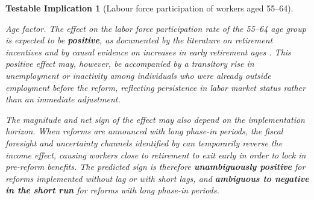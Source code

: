 \documentclass[11pt,english,a4paper, twoside, authoryear]{article}
\newtheorem{testable}{Testable Implication}}
\begin{document}
\begin{testable}[Labour force participation of workers aged 55--64]\label{test:emp_old}

\textit{Age factor.} %
The effect on the labor force participation rate of the 55--64 age group is expected to be \textbf{positive}, as documented by the literature on retirement incentives \citep{GruberWise1999} and by causal evidence on increases in early retirement ages \citep{StaubliZweimuller2013}. This positive effect may, however, be accompanied by a transitory rise in unemployment or inactivity among individuals who were already outside employment before the reform, reflecting persistence in labor market status rather than an immediate adjustment.

The magnitude and net sign of the effect may also depend on the implementation horizon. When reforms are announced with long phase-in periods, the fiscal foresight and uncertainty channels identified by \citet{BiZubairy2023} can temporarily reverse the income effect, causing workers close to retirement to exit early in order to lock in pre-reform benefits. The predicted sign is therefore \textbf{unambiguously positive} for reforms implemented without lag or with short lags, and \textbf{ambiguous to negative in the short run} for reforms with long phase-in periods.


\end{testable}
\end{document}
